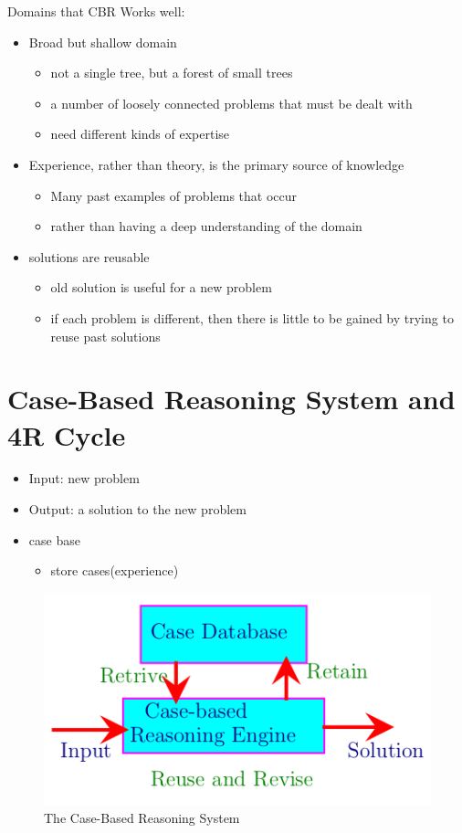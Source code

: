 Domains that CBR Works well:
\begin{itemize}
\item Broad but shallow domain
\begin{itemize}
\item not a single tree, but a forest of small trees
\item a number of loosely connected problems that must be dealt with
\item need different kinds of expertise
\end{itemize}
\item Experience, rather than theory, is the primary source of knowledge
\begin{itemize}
\item Many past examples of problems that occur
\item rather than having a deep understanding of the domain
\end{itemize}
\item solutions are reusable
\begin{itemize}
\item old solution is useful for a new problem
\item if each problem is different, then there is little to be gained by trying to reuse past solutions
\end{itemize}
\end{itemize}

\section{Case-Based Reasoning System and 4R Cycle}
\begin{itemize}
\item Input: new problem
\item Output: a solution to the new problem
\item case base
\begin{itemize}
\item store cases(experience)
\end{itemize}
\end{itemize}

\begin{figure}[h]
\includegraphics[scale=1]{chap7_pics/case_base_sys.png} 
\caption{The Case-Based Reasoning System}
\end{figure}


